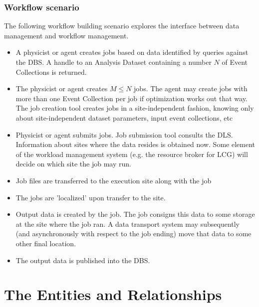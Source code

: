 \documentclass{cmspaper}
\begin{document}
\subsubsection{Workflow scenario}

The following workflow building scenario explores the 
interface between data management and workflow management.

\begin{itemize}

\item A physicist or agent creates jobs based on data identified by queries against 
the DBS.  A handle to an Analysis Dataset containing a number $N$ of
Event Collections is returned.  

\item The physicist or agent creates $M \le N$ jobs.  The agent may create 
      jobs with more than one Event Collection per job if optimization 
      works out that way.  The job creation tool creates jobs in a 
      site-independent fashion, knowing only about site-independent dataset 
      parameters, input event collections, etc 

\item Physicist or agent submits jobs. Job submission tool consults the DLS. 
      Information about sites where the data resides is obtained now. Some
      element of the workload management system (e.g. the resource broker
      for LCG) will decide on which site the job may run.

\item Job files are transferred to the execution site along with the job 

\item The jobs are 'localized' upon transfer to the site. 

\item Output data is created by the job. The job consigns this data to
      some storage at the site where the job ran. A data transport system
      may subsequently (and asynchronously with respect to the job ending)
      move that data to some other final location.

\item The output data is published into the DBS.

\end{itemize}




\section{The Entities and Relationships}
\label{sec:details}
\end{document}

